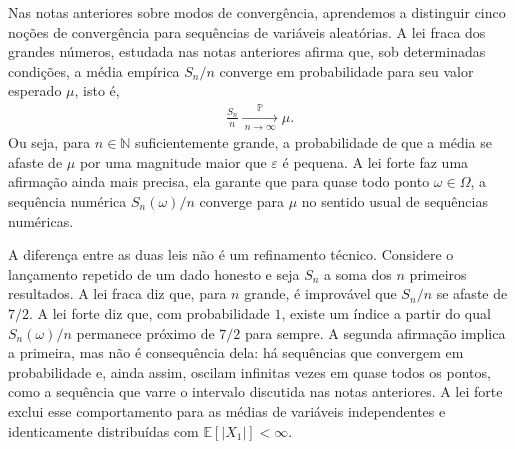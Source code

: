 \documentclass[12pt,portuguese]{article}
\theoremstyle{definition}
\theoremstyle{plainexercise}
\theoremstyle{starredexercise}
\theoremstyle{definition}
\begin{document}
Nas notas anteriores sobre modos de convergência, aprendemos a distinguir
cinco noções de convergência para sequências de variáveis aleatórias. A lei
fraca dos grandes números, estudada nas notas anteriores afirma que, sob determinadas condições, 
a média empírica $S_n/n$ converge em probabilidade para seu valor esperado $\mu$, isto é, 
\begin{align*}
\frac{S_n}{n} \xrightarrow[\ n\to\infty\ ]{\mathbb{P}} \mu.
\end{align*}
Ou seja, para $n\in\mathbb{N}$ suficientemente grande, a probabilidade de que a
média se afaste de $\mu$ por uma magnitude maior que $\varepsilon$ é pequena. 
A lei forte faz uma afirmação ainda mais precisa, ela garante que para quase todo ponto $\omega\in\Omega$, 
a sequência numérica $S_n(\omega)/n$ converge para $\mu$ no sentido usual de sequências numéricas. 

A diferença entre as duas leis não é um refinamento técnico. Considere o
lançamento repetido de um dado honesto e seja $S_n$ a soma dos $n$ primeiros
resultados. A lei fraca diz que, para $n$ grande, é improvável que $S_n/n$ se
afaste de $7/2$. A lei forte diz que, com probabilidade $1$, existe um índice
a partir do qual $S_n(\omega)/n$ permanece próximo de $7/2$ para sempre. A
segunda afirmação implica a primeira, mas não é consequência dela: há
sequências que convergem em probabilidade e, ainda assim, oscilam infinitas
vezes em quase todos os pontos, como a sequência que varre o intervalo
discutida nas notas anteriores. A lei forte exclui esse comportamento para as
médias de variáveis independentes e identicamente distribuídas com
$\mathbb{E}[|X_1|]<\infty$.
\end{document}
